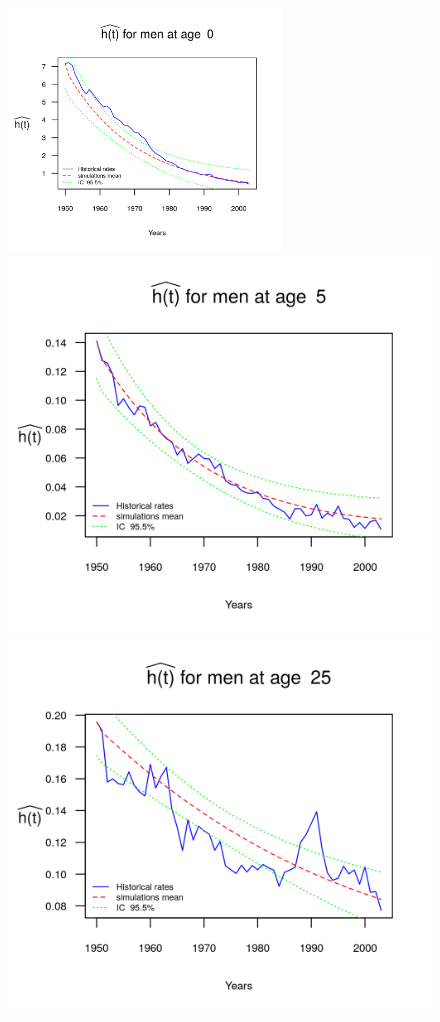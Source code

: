 \documentclass[smallextended]{svjour3}
\begin{document}
\begin{figure}[H]
    \includegraphics[width = 2.85in]{PlotMen0.png}
    \includegraphics{PlotMen5.png}
    \includegraphics{PlotMen25.png}

\end{figure}
\end{document}
